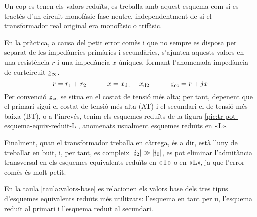 Un cop es tenen els valors reduïts, es treballa amb aquest esquema com si es tractés d'un circuit monofàsic fase-neutre, independentment de si el transformador real original era monofàsic o trifàsic.

En la pràctica, a causa del petit error comès i que no sempre es disposa per separat de les impedàncies primàries i secundàries,  s'ajunten aquests valors en una resistència $r$ i una  impedància $x$ úniques, formant l'anomenada impedància de curtcircuit $\cmplx{z}\ped{cc}$.
\begin{equation}
    r= r\ped{1}+r\ped{2} \qquad\quad x= x\ped{d1}+x\ped{d2} \qquad\quad \cmplx{z}\ped{cc} = r + j x
\end{equation}
Per convenció $\cmplx{z}\ped{cc}$ se situa en el costat de tensió més alta; per tant, depenent que el primari  sigui el costat de tensió més alta (AT) i el secundari el de tensió més baixa  (BT), o a l'inrevés, tenim els esquemes reduïts de la figura \vref{pic:tr-pot-esquema-equiv-reduit-L}, anomenats usualment esquemes reduïts en «L».  
\begin{center}
    
    \label{pic:tr-pot-esquema-equiv-reduit-L}
\end{center}

\vspace{-4mm}
Finalment, quan el transformador treballa en càrrega, és a dir, està lluny de treballar en buit, i, per tant, es compleix $|\cmplx{i}_2| \gg |\cmplx{i}_0|$, es pot eliminar l'admitància transversal en els esquemes equivalents reduïts en «T» o en «L», ja que l'error comès és molt petit.

En la  taula \vref{taula:valors-base} es relacionen els valors base dels tres tipus d'esquemes equivalents reduïts més utilitzats: l'esquema en tant per u, l'esquema reduït al primari i l'esquema reduït al secundari.

